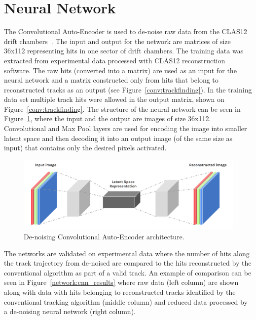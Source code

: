 \section{Neural Network}

The Convolutional Auto-Encoder is used to de-noise raw data from the CLAS12 drift chambers~\cite{Thomadakis:2022zcd}. 
The input and output for the network are matrices of size 36x112 representing hits in one sector of drift chambers. 
The training data was extracted from experimental data processed with CLAS12 reconstruction software. 
The raw hits (converted into a matrix) are used as an input for the neural network and a matrix constructed 
only from hits that belong to reconstructed tracks as an output (see Figure~\ref{conv:trackfinding}). 
In the training data set multiple track hits were allowed in the output matrix, shown on Figure~\ref{conv:trackfinding}.
The structure of the neural network can be seen in Figure~\ref{network:cnn_encoder}, where the input and the output are images
of size 36x112. Convolutional and Max Pool layers are used for encoding the image into smaller latent space and then
decoding it into an output image (of the same size as input) that contains only the desired pixels activated.

\begin{figure}[!h]
\begin{center}
 \includegraphics[width=5.1in]{images/convolutional-autoencoder.png}
\caption {De-noising Convolutional Auto-Encoder architecture. }
 \label{network:cnn_encoder}
 \end{center}
\end{figure}

The networks are validated on experimental data where the number of hits along the 
track trajectory from de-noised are compared to the hits reconstructed by the conventional algorithm
as part of a valid track. An example of comparison can be seen in Figure~\ref{network:cnn_results} 
where raw data (left column) are shown along with data with hits belonging to reconstructed tracks 
identified by the conventional tracking algorithm (middle column) and 
reduced data processed by a de-noising neural network (right column).

